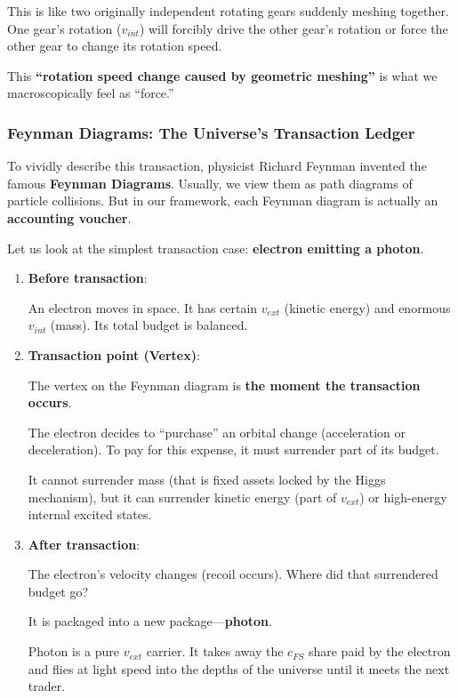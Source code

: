 This is like two originally independent rotating gears suddenly meshing together. One gear's rotation ($v_{int}$) will forcibly drive the other gear's rotation or force the other gear to change its rotation speed.

This \textbf{``rotation speed change caused by geometric meshing''} is what we macroscopically feel as ``force.''

\subsubsection{Feynman Diagrams: The Universe's Transaction Ledger}

To vividly describe this transaction, physicist Richard Feynman invented the famous \textbf{Feynman Diagrams}. Usually, we view them as path diagrams of particle collisions. But in our framework, each Feynman diagram is actually an \textbf{accounting voucher}.

Let us look at the simplest transaction case: \textbf{electron emitting a photon}.

\begin{enumerate}
\item \textbf{Before transaction}:

    An electron moves in space. It has certain $v_{ext}$ (kinetic energy) and enormous $v_{int}$ (mass). Its total budget is balanced.

\item \textbf{Transaction point (Vertex)}:

    The vertex on the Feynman diagram is \textbf{the moment the transaction occurs}.

    The electron decides to ``purchase'' an orbital change (acceleration or deceleration). To pay for this expense, it must surrender part of its budget.

    It cannot surrender mass (that is fixed assets locked by the Higgs mechanism), but it can surrender kinetic energy (part of $v_{ext}$) or high-energy internal excited states.

\item \textbf{After transaction}:

    The electron's velocity changes (recoil occurs). Where did that surrendered budget go?

    It is packaged into a new package---\textbf{photon}.

    Photon is a pure $v_{ext}$ carrier. It takes away the $c_{FS}$ share paid by the electron and flies at light speed into the depths of the universe until it meets the next trader.
\end{enumerate}

